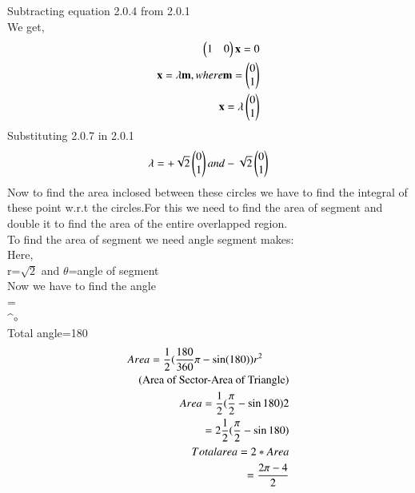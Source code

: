 \documentclass[journal,12pt,twocolumn]{IEEEtran}
\begin{document}
Subtracting equation 2.0.4 from 2.0.1\\
We get,
 \begin{align}
 \begin{pmatrix}1&0\end{pmatrix}\mathbf{x}=0\\
 \mathbf{x} = \lambda \mathbf{m}, where \mathbf{m} = \begin{pmatrix}0\\1\end{pmatrix}\\
 \mathbf{x} = \lambda \begin{pmatrix}0\\1\end{pmatrix}\\
 \end{align}
 Substituting 2.0.7 in 2.0.1\\
 \begin{align}
  \mathbf{\lambda} = +\sqrt{2}\begin{pmatrix}0\\1\end{pmatrix} and - \sqrt{2}\begin{pmatrix}0\\1\end{pmatrix}
 \end{align}
 Now to find the area inclosed between these circles we have to find the integral of these point w.r.t the circles.For this we need to find the area of segment  and double it to find the area of the entire overlapped region.\\ 
To find the area of segment we need angle segment makes:\\
Here,\\
r=$\sqrt{2}$ and $\theta$=angle of segment\\ 
Now we have to find the angle\\ 
\sin \theta=\\ 
^${\circ}$\\
Total angle=180\\
 \begin{align}
 \begin{multlined}
 Area=\frac{1}{2}(\frac{180}{360}\pi-\sin (180))r^{2}\\
 $(Area of Sector-Area of Triangle)$
\end{multlined}\\
Area={\frac{1}{2}}(\frac{\pi}{2}-\sin 180)2\\
=2{\frac{1}{2}}(\frac{\pi}{2}-\sin 180)\\
Total area=2*Area\\
=\frac{2\pi-4}{2}
\end{align}

 
  
\end{document}

